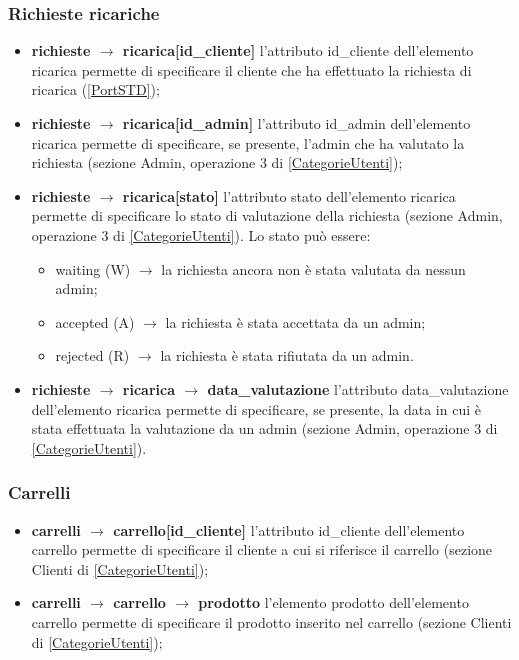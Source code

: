 \documentclass[a4paper, 14pt]{article}
\begin{document}
\begin{flushleft}
			\subsubsection{Richieste ricariche} 
			\begin{itemize}
				\item \textbf{richieste $\rightarrow$ ricarica[id\_cliente] } l'attributo id\_cliente dell'elemento ricarica permette di specificare il cliente che ha effettuato la richiesta di ricarica (\ref{PortSTD});
				\item \textbf{richieste $\rightarrow$ ricarica[id\_admin] } l'attributo id\_admin dell'elemento ricarica permette di specificare, se presente, l'admin che ha valutato la richiesta (sezione Admin, operazione 3 di \ref{CategorieUtenti});
				\item \textbf{richieste $\rightarrow$ ricarica[stato] } l'attributo stato dell'elemento ricarica permette di specificare lo stato di valutazione della richiesta 
				(sezione Admin, operazione 3 di \ref{CategorieUtenti}). Lo stato può essere:
				\begin{itemize}
					\item waiting (W) $\rightarrow$ la richiesta ancora non è stata valutata da nessun admin;
					\item accepted (A) $\rightarrow$ la richiesta è stata accettata da un admin;
					\item rejected (R) $\rightarrow$ la richiesta è stata rifiutata da un admin.
				\end{itemize}
				\item \textbf{richieste $\rightarrow$ ricarica $\rightarrow$ data\_valutazione } l'attributo data\_valutazione dell'elemento ricarica permette di specificare, se presente, la data in cui è stata effettuata la valutazione da un admin (sezione Admin, operazione 3 di \ref{CategorieUtenti}).
			\end{itemize}
			
			\subsubsection{Carrelli} 
			\begin{itemize}
				\item \textbf{carrelli $\rightarrow$ carrello[id\_cliente] } l'attributo id\_cliente dell'elemento carrello permette di specificare il cliente a cui si riferisce il carrello (sezione Clienti di \ref{CategorieUtenti});
				\item \textbf{carrelli $\rightarrow$ carrello $\rightarrow$ prodotto} l'elemento prodotto dell'elemento carrello permette di specificare il prodotto inserito nel carrello (sezione Clienti di \ref{CategorieUtenti});
			\end{itemize}
		\newpage
		

\end{flushleft}
\end{document}
